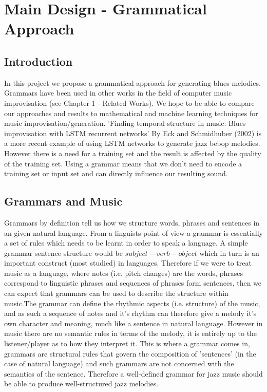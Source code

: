 \documentclass[pdftex,12pt,a4paper]{report}
\begin{document}
\pagebreak

\chapter{Main Design - Grammatical Approach}

\section{Introduction}
In this project we propose a grammatical approach for generating blues melodies. Grammars have been used in other works in the field of computer music improvisation (see Chapter 1 - Related Works). We hope to be able to compare our approaches and results to mathematical and machine learning techniques for music improvisation/generation. 'Finding temporal structure in music: Blues improvisation with LSTM recurrent networks' By Eck and Schmidhuber (2002) \cite{eck02} is a more recent example of using LSTM networks to generate jazz bebop melodies. However there is a need for a training set and the result is affected by the quality of the training set. Using a grammar means that we don't need to encode a training set or input set and can directly influence our resulting sound.

\section{Grammars and Music}
Grammars by definition tell us how we structure words, phrases and sentences in an given natural language. From a linguists point of view a grammar is essentially a set of rules which needs to be learnt in order to speak a language. A simple grammar sentence structure would be $subject-verb-object$ which in turn is an important construct (most studied) in languages.
Therefore if we were to treat music as a language, where notes (i.e. pitch changes) are the words, phrases correspond to linguistic phrases and sequences of phrases form sentences, then we can expect that grammars can be used to describe the structure within music.The grammar can define the rhythmic aspects (i.e. structure) of the music, and as such a sequence of notes and it's rhythm can therefore give a melody it's own character and meaning, much like a sentence in natural language. However in music there are no semantic rules in terms of the melody, it is entirely up to the listener/player as to how they interpret it. This is where a grammar comes in, grammars are structural rules that govern the composition of 'sentences' (in the case of natural language) and such grammars are not concerned with the semantics of the sentence. Therefore a well-defined grammar for jazz music should be able to produce well-structured jazz melodies.
\end{document}
